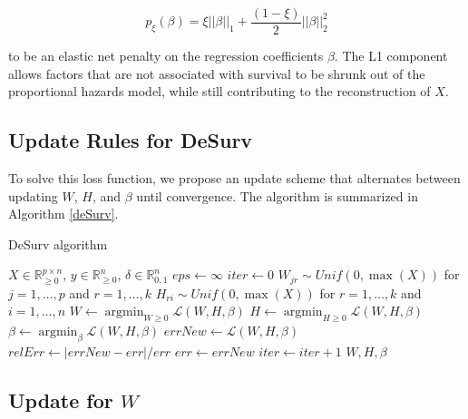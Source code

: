 \documentclass[9pt,twocolumn,twoside,]{pnas-new}
\begin{document}
\begin{equation}
    p_{\xi}(\beta) = \xi||\beta||_1 + \frac{(1-\xi)}{2} ||\beta||^2_2
\end{equation}

to be an elastic net penalty on the regression coefficients \(\beta\).
The L1 component allows factors that are not associated with survival to
be shrunk out of the proportional hazards model, while still
contributing to the reconstruction of \(X\).

\subsection*{Update Rules for DeSurv}\label{update-rules-for-desurv}

To solve this loss function, we propose an update scheme that alternates
between updating \(W\), \(H\), and \(\beta\) until convergence. The
algorithm is summarized in Algorithm \ref{deSurv}.

\begin{algorithm}
    \caption{DeSurv algorithm}\label{deSurv}

    \begin{algorithmic}[1]
        \Require $X \in \mathbb{R}_{\geq 0}^{p \times n}$, $y \in \mathbb{R}^n_{\geq 0}$, $\delta \in \mathbb{R}_{0,1}^{n}$
        \State $eps \gets \infty$
        \State $iter \gets 0$
        \State $W_{jr} \sim Unif(0,\max(X))$ for $j=1,\dots,p$ and $r=1,\dots, k$
        \State $H_{ri} \sim Unif(0, \max(X))$ for $r=1,\dots,k$ and $i=1,\dots,n$
            \State $W \gets \mathop{\mathrm{argmin}}_{W \geq 0} \mathcal{L}(W,H,\beta)$
            \State $H \gets \mathop{\mathrm{argmin}}_{H \geq 0} \mathcal{L}(W,H,\beta)$
            \State $\beta \gets \mathop{\mathrm{argmin}}_{\beta} \mathcal{L}(W,H,\beta)$
            \State $errNew \gets \mathcal{L}(W,H,\beta)$
            \State $relErr \gets |errNew - err|/err$
            \State $err \gets errNew$
            \State $iter \gets iter + 1$
        \EndWhile
        \State \Return $W, H, \beta$
    \end{algorithmic}
\end{algorithm}

\subsection*{\texorpdfstring{Update for
\(W\)}{Update for W}}\label{update-for-w}
\end{document}
